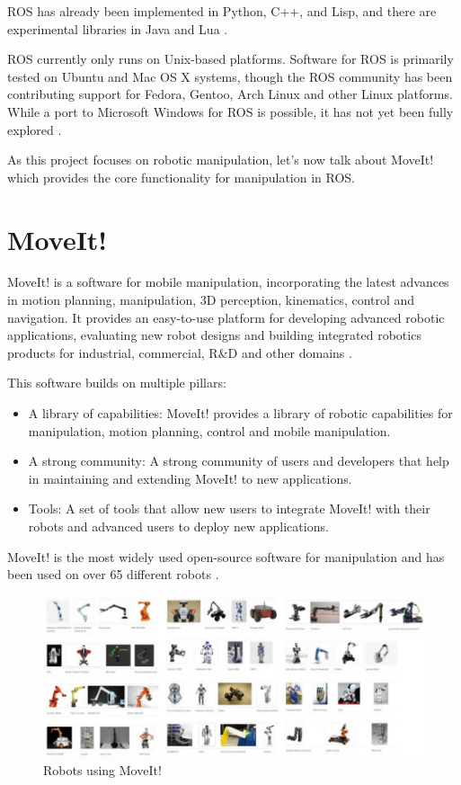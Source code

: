  ROS has already been implemented in Python, C++, and Lisp, and there are experimental libraries in Java and Lua \cite{wikiros}.

ROS currently only runs on Unix-based platforms. Software for ROS is primarily tested on Ubuntu and Mac OS X systems, though the ROS community has been contributing support for Fedora, Gentoo, Arch Linux and other Linux platforms. While a port to Microsoft Windows for ROS is possible, it has not yet been fully explored \cite{wikiros}.

As this project focuses on robotic manipulation, let's now talk about MoveIt! which provides the core functionality for manipulation in ROS.

\section{MoveIt!}
MoveIt! is a software for mobile manipulation, incorporating the latest advances in motion planning, manipulation, 3D perception, kinematics, control and navigation. It provides an easy-to-use platform for developing advanced robotic applications, evaluating new robot designs and building integrated robotics products for industrial, commercial, R\&D and other domains \cite{moveit}. 

This software builds on multiple pillars:
\begin{itemize}
\item A library of capabilities: MoveIt! provides a library of robotic capabilities for manipulation, motion planning, control and mobile manipulation.
\item A strong community: A strong community of users and developers that help in maintaining and extending MoveIt! to new applications.
\item Tools: A set of tools that allow new users to integrate MoveIt! with their robots and advanced users to deploy new applications.
\end{itemize}

MoveIt! is the most widely used open-source software for manipulation and has been used on over 65 different robots \cite{koubaa2016robot}. 

\begin{figure}[htbp]
	\centering
	\includegraphics{chapters/figures/ROS/robots_moveit.jpg}
	\caption{Robots using MoveIt!}
	\label{fig:robots_moveit}
\end{figure}


